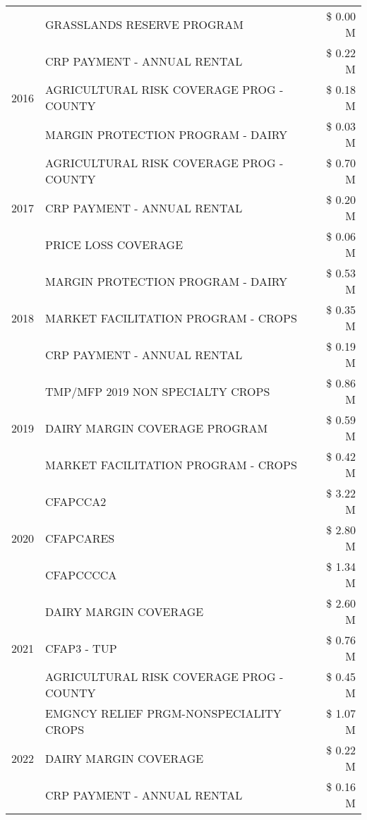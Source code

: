 \begin{tabular}{llr}
 & GRASSLANDS RESERVE PROGRAM & \$ 0.00 M \\
\cline{1-3}
\multirow[t]{3}{*}{2016} & CRP PAYMENT - ANNUAL RENTAL & \$ 0.22 M \\
 & AGRICULTURAL RISK COVERAGE PROG - COUNTY & \$ 0.18 M \\
 & MARGIN PROTECTION PROGRAM - DAIRY & \$ 0.03 M \\
\cline{1-3}
\multirow[t]{3}{*}{2017} & AGRICULTURAL RISK COVERAGE PROG - COUNTY & \$ 0.70 M \\
 & CRP PAYMENT - ANNUAL RENTAL & \$ 0.20 M \\
 & PRICE LOSS COVERAGE & \$ 0.06 M \\
\cline{1-3}
\multirow[t]{3}{*}{2018} & MARGIN PROTECTION PROGRAM - DAIRY & \$ 0.53 M \\
 & MARKET FACILITATION PROGRAM - CROPS & \$ 0.35 M \\
 & CRP PAYMENT - ANNUAL RENTAL & \$ 0.19 M \\
\cline{1-3}
\multirow[t]{3}{*}{2019} & TMP/MFP 2019 NON SPECIALTY CROPS & \$ 0.86 M \\
 & DAIRY MARGIN COVERAGE PROGRAM & \$ 0.59 M \\
 & MARKET FACILITATION PROGRAM - CROPS & \$ 0.42 M \\
\cline{1-3}
\multirow[t]{3}{*}{2020} & CFAPCCA2 & \$ 3.22 M \\
 & CFAPCARES & \$ 2.80 M \\
 & CFAPCCCCA & \$ 1.34 M \\
\cline{1-3}
\multirow[t]{3}{*}{2021} & DAIRY MARGIN COVERAGE & \$ 2.60 M \\
 & CFAP3 - TUP & \$ 0.76 M \\
 & AGRICULTURAL RISK COVERAGE PROG - COUNTY & \$ 0.45 M \\
\cline{1-3}
\multirow[t]{3}{*}{2022} & EMGNCY RELIEF PRGM-NONSPECIALITY CROPS & \$ 1.07 M \\
 & DAIRY MARGIN COVERAGE & \$ 0.22 M \\
 & CRP PAYMENT - ANNUAL RENTAL & \$ 0.16 M \\
\cline{1-3}
\bottomrule
\end{tabular}
